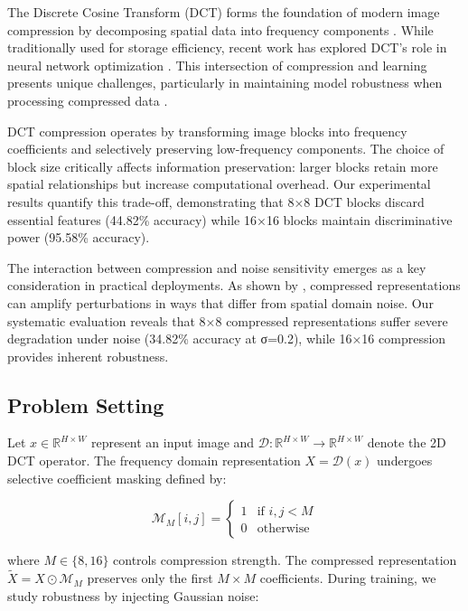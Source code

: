 \documentclass{article} %
\begin{document}
The Discrete Cosine Transform (DCT) forms the foundation of modern image compression by decomposing spatial data into frequency components \citep{A.M2014JpegIC}. While traditionally used for storage efficiency, recent work has explored DCT's role in neural network optimization \citep{Gueguen2018FasterNN, wang2022learning}. This intersection of compression and learning presents unique challenges, particularly in maintaining model robustness when processing compressed data \citep{Machiraju2023FrequencyBasedVA}.

DCT compression operates by transforming image blocks into frequency coefficients and selectively preserving low-frequency components. The choice of block size critically affects information preservation: larger blocks retain more spatial relationships but increase computational overhead. Our experimental results quantify this trade-off, demonstrating that 8×8 DCT blocks discard essential features (44.82\% accuracy) while 16×16 blocks maintain discriminative power (95.58\% accuracy).

The interaction between compression and noise sensitivity emerges as a key consideration in practical deployments. As shown by \citet{azimi2020structural}, compressed representations can amplify perturbations in ways that differ from spatial domain noise. Our systematic evaluation reveals that 8×8 compressed representations suffer severe degradation under noise (34.82\% accuracy at σ=0.2), while 16×16 compression provides inherent robustness.

\subsection{Problem Setting}
Let $x \in \mathbb{R}^{H \times W}$ represent an input image and $\mathcal{D}: \mathbb{R}^{H \times W} \rightarrow \mathbb{R}^{H \times W}$ denote the 2D DCT operator. The frequency domain representation $X = \mathcal{D}(x)$ undergoes selective coefficient masking defined by:

\begin{equation}
    \mathcal{M}_M[i,j] = \begin{cases}
        1 & \text{if } i,j < M \\
        0 & \text{otherwise}
    \end{cases}
\end{equation}

where $M \in \{8,16\}$ controls compression strength. The compressed representation $\tilde{X} = X \odot \mathcal{M}_M$ preserves only the first $M \times M$ coefficients. During training, we study robustness by injecting Gaussian noise:
\end{document}
